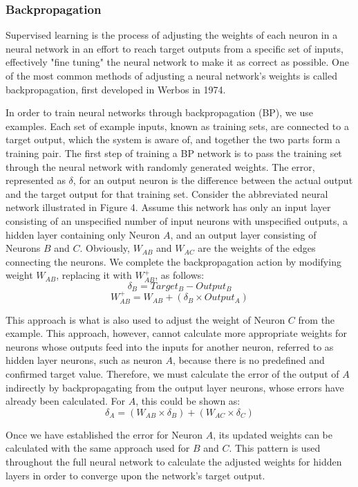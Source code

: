 \subsubsection{Backpropagation}
 

Supervised learning is the process of adjusting the weights of each neuron in a neural network in an effort to reach target outputs from a specific set of inputs, effectively "fine tuning" the neural network to make it as correct as possible. One of the most common methods of adjusting a neural network's weights is called backpropagation, first developed in Werbos in 1974.

In order to train neural networks through backpropagation (BP), we use examples. Each set of example inputs, known as training sets, are connected to a target output, which the system is aware of, and together the two parts form a training pair. The first step of training a BP network is to pass the training set through the neural network with randomly generated weights. The error, represented as $\delta$, for an output neuron is the difference between the actual output and the target output for that training set. Consider the abbreviated neural network illustrated in Figure 4. Assume this network has only an input layer consisting of an unspecified number of input neurons with unspecified outputs, a hidden layer containing only Neuron $A$, and an output layer consisting of Neurons $B$ and $C$. Obviously, $W_{AB}$ and $W_{AC}$ are the weights of the edges connecting the neurons. We complete the backpropagation action by modifying weight $W_{AB}$, replacing it with $W^+_{AB}$, as follows:
$$\delta_B=Target_B-Output_B$$
$$W^+_{AB}=W_{AB}+(\delta_B\times Output_A)$$

This approach is what is also used to adjust the weight of Neuron $C$ from the example. This approach, however, cannot calculate more appropriate weights for neurons whose outputs feed into the inputs for another neuron, referred to as hidden layer neurons, such as neuron $A$, because there is no predefined and confirmed target value. Therefore, we must calculate the error of the output of $A$ indirectly by backpropagating from the output layer neurons, whose errors have already been calculated. For $A$, this could be shown as:
$$\delta_A = (W_{AB}\times\delta_B)+(W_{AC}\times\delta_C)$$

Once we have established the error for Neuron $A$, its updated weights can be calculated with the same approach used for $B$ and $C$. This pattern is used throughout the full neural network to calculate the adjusted weights for hidden layers in order to converge upon the network's target output.